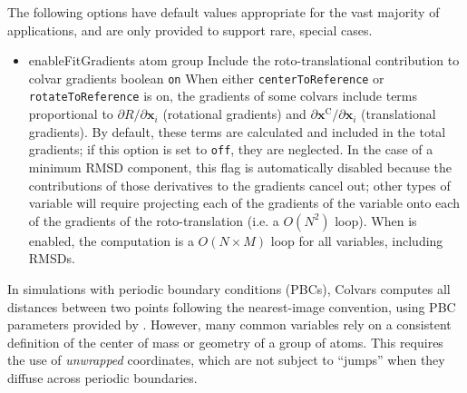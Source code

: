 The following options have default values appropriate for the vast majority of applications, and are only provided to support rare, special cases.
\begin{itemize}

\item %
  \keydef%
    {enableFitGradients}{%
    atom group}{%
    Include the roto-translational contribution to colvar gradients}{%
    boolean}{%
    \texttt{on}}{%
    When either \texttt{centerToReference} or \texttt{rotateToReference} is on,
    the gradients of some colvars include terms proportional to
    $\partial{}R/\partial\mathbf{x}_{i}$ (rotational gradients) and
    $\partial\mathbf{x}^{\mathrm{C}}/\partial\mathbf{x}_{i}$ (translational gradients).
    By default, these terms are calculated and included in the total gradients;
    if this option is set to \texttt{off}, they are neglected.
    In the case of a minimum RMSD component, this flag is automatically disabled because the contributions of those derivatives to the gradients cancel out; other types of variable will require projecting each of the gradients of the variable onto each of the gradients of the roto-translation (i.e.{} a $O(N^2)$ loop).
    When  is enabled, the computation is a $O(N\times{}M)$ loop for all variables, including RMSDs.
}

\end{itemize}



In simulations with periodic boundary conditions (PBCs), Colvars computes all distances between two points following the nearest-image convention, using PBC parameters provided by \MDENGINE.
However, many common variables rely on a consistent definition of the center of mass or geometry of a group of atoms.
This requires the use of \emph{unwrapped} coordinates, which are not subject to ``jumps'' when they diffuse across periodic boundaries.


